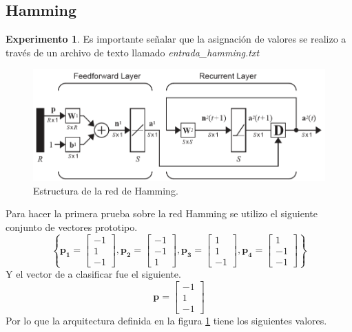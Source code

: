 
\subsection{Hamming}
\textbf{Experimento 1}. Es importante señalar que la asignación de valores se realizo a través de un archivo de texto llamado \emph{entrada\_hamming.txt}
\begin{figure}[H]
    \begin{center}
        \includegraphics[width=16cm]{img/hamming/diagrama.png}
        \caption{Estructura de la red de Hamming. \cite{libro1}}
        \label{fig:hamming-diagrama2}
    \end{center}
\end{figure}
Para hacer la primera prueba sobre la red Hamming se utilizo el siguiente conjunto de vectores prototipo.
\[ \left\lbrace \boldsymbol{p_1} = \left[\begin{array}{c}-1\\ 1\\ -1\end{array}\right], \boldsymbol{p_2} = \left[\begin{array}{c}-1\\ -1\\ 1\end{array}\right], \boldsymbol{p_3} = \left[\begin{array}{c}1\\ 1\\ -1\end{array}\right], \boldsymbol{p_4} = \left[\begin{array}{c}1\\ -1\\ -1\end{array}\right] \right\rbrace \]
Y el vector de a clasificar fue el siguiente.
\[ \boldsymbol{p} = \left[\begin{array}{c}-1\\ 1\\ -1\end{array}\right] \]
Por lo que la arquitectura definida en la figura \ref{fig:hamming-diagrama2} tiene los siguientes valores.
